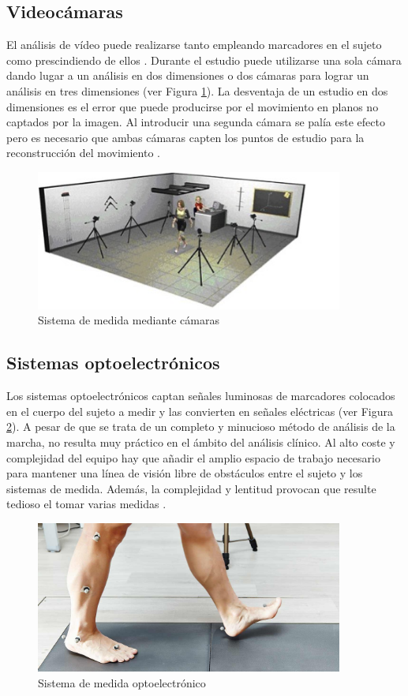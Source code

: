	\subsection{Videocámaras}
	El análisis de vídeo puede realizarse tanto empleando marcadores en el sujeto como prescindiendo de ellos \cite{techniques2}. Durante el estudio puede utilizarse una sola cámara dando lugar a un análisis en dos dimensiones o dos cámaras para lograr un análisis en tres dimensiones (ver Figura \ref{fig:camera}). \cite{prueba} La desventaja de un estudio en dos dimensiones es el error que puede producirse por el movimiento en planos no captados por la imagen. Al introducir una segunda cámara se palía este efecto pero es necesario que ambas cámaras capten los puntos de estudio para la reconstrucción del movimiento \cite{techniques}.
	\begin{figure}[H]
		\centering
		\includegraphics[width=0.9\textwidth]{./graphics/camera}
		\caption{Sistema de medida mediante cámaras} \label{fig:camera}
	\end{figure}
	
	\subsection{Sistemas optoelectrónicos}
	
	Los sistemas optoelectrónicos captan señales luminosas de marcadores colocados en el cuerpo del sujeto a medir y las convierten en señales eléctricas (ver Figura \ref{fig:opt}). A pesar de que se trata de un completo y minucioso método de análisis de la marcha, no resulta muy práctico en el ámbito del análisis clínico. Al alto coste y complejidad del equipo hay que añadir el amplio espacio de trabajo necesario para mantener una línea de visión libre de obstáculos entre el sujeto y los sistemas de medida. Además, la complejidad y lentitud provocan que resulte tedioso el tomar varias medidas \cite{begona,opt}.
		\begin{figure}[H]
			\centering
			\includegraphics[width=0.9\textwidth]{./graphics/opt}
			\caption{Sistema de medida optoelectrónico} \label{fig:opt}
		\end{figure}

